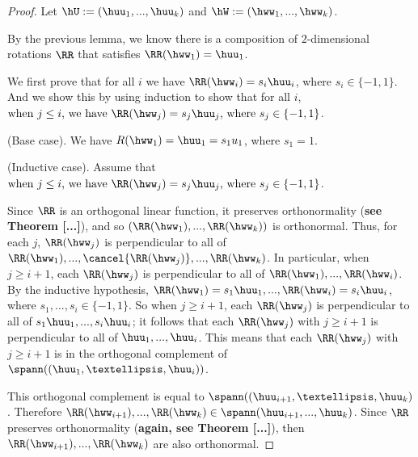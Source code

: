 \begin{proof}
    Let $\hU := (\huu_1, ..., \huu_k)$ and $\hW := (\hww_1, ..., \hww_k)$. 
    
    By the previous lemma, we know there is a composition of $2$-dimensional rotations $\RR$ that satisfies $\RR(\hww_1) = \huu_1$. 
    
    We first prove that for all $i$ we have $\RR(\hww_i) = s_i \huu_i$, where $s_i \in \{-1, 1\}$. And we show this by using induction to show that for all $i$, $\text{when $j \leq i$, we have $\RR(\hww_j) = s_j \huu_j$, where $s_j \in \{-1, 1\}$}$.

    (Base case). We have $R(\hww_1) = \huu_1 = s_1 u_1$, where $s_1 = 1$.

    (Inductive case). Assume that $\text{when $j \leq i$, we have $\RR(\hww_j) = s_j \huu_j$, where $s_j \in \{-1, 1\}$}$.

    Since $\RR$ is an orthogonal linear function, it preserves orthonormality (\textbf{see Theorem [...]}), and so $(\RR(\hww_1), ..., \RR(\hww_k))$ is orthonormal. Thus, for each $j$, $\RR(\hww_j)$ is perpendicular to all of $\RR(\hww_1), ..., \cancel{\RR(\hww_j)}, ..., \RR(\hww_k)$. In particular, when $j \geq i + 1$, each $\RR(\hww_j)$ is perpendicular to all of $\RR(\hww_1), ..., \RR(\hww_i)$. By the inductive hypothesis, $\RR(\hww_1) = s_1 \huu_1, ..., \RR(\hww_i) = s_i \huu_i$, where $s_1, ..., s_i \in \{-1, 1\}$. So when $j \geq i + 1$, each $\RR(\hww_j)$ is perpendicular to all of $s_1 \huu_1, ..., s_i \huu_i$; it follows that each $\RR(\hww_j)$ with $j \geq i + 1$ is perpendicular to all of $\huu_1, ..., \huu_i$. This means that each $\RR(\hww_j)$ with $j \geq i + 1$ is in the orthogonal complement of $\spann((\huu_1, …, \huu_i))$.
    
    This orthogonal complement is equal to $\spann((\huu_{i + 1}, …, \huu_k)$. Therefore $\RR(\hww_{i + 1}), ..., \RR(\hww_k) \in \spann(\huu_{i + 1}, ..., \huu_k)$. Since $\RR$ preserves orthonormality (\textbf{again, see Theorem [...]}), then $\RR(\hww_{i + 1}), ..., \RR(\hww_k)$ are also orthonormal.
    

\end{proof}
